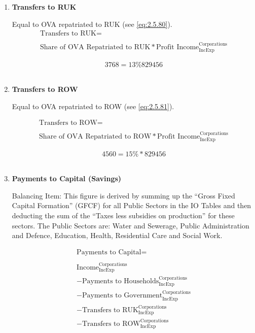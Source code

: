 \begin{enumerate}
\item \textbf {Transfers to RUK}

Equal to OVA repatriated to RUK (see \ref{eq:2.5.80}). \cite{ScotGov2012}\\

\begin{equation}
\begin{split}
\text{Transfers to RUK} =  \\ \\
\text{Share of OVA Repatriated to RUK}*\text{Profit Income}^\text{Corporations}_\text{IncExp}
\end{split} \label{eq:2.5.31}
\end{equation}

\begin{equation} \nonumber
3768 = 13\%829456
\end{equation}\\


\item \textbf {Transfers to ROW}

Equal to OVA repatriated to ROW (see \ref{eq:2.5.81}). \cite{ScotGov2012}

\begin{equation}
\begin{split}
\text{Transfers to ROW} =  \\ \\
\text{Share of OVA Repatriated to ROW}*\text{Profit Income}^\text{Corporations}_\text{IncExp}
\end{split} \label{eq:2.5.32}
\end{equation}

\begin{equation} \nonumber
4560 = 15\%*829456
\end{equation}\\


\item \textbf {Payments to Capital (Savings)}

Balancing Item: This figure is derived by summing up the ``Gross Fixed Capital Formation'' (GFCF) for all Public Sectors in the IO Tables and then deducting the sum of the ``Taxes less subsidies on production'' for these sectors. The Public Sectors are: Water and Sewerage, Public Administration and Defence, Education, Health, Residential Care and Social Work. \cite{ScotGov2013a}

\begin{equation}
\begin{split}
\text{Payments to Capital} =  \\ \\
\text{Income}^\text{Corporations}_\text{IncExp}\\
-\text{Payments to Households}^\text{Corporations}_\text{IncExp}\\
-\text{Payments to Government}^\text{Corporations}_\text{IncExp}\\
-\text{Transfers to RUK}^\text{Corporations}_\text{IncExp}\\
-\text{Transfers to ROW}^\text{Corporations}_\text{IncExp}
\end{split} \label{eq:2.5.33}
\end{equation}


\end{enumerate}
